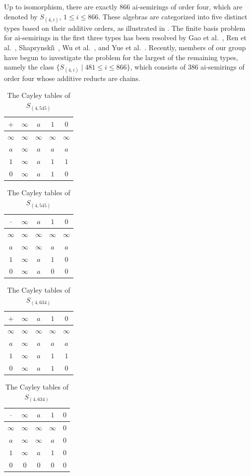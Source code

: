 \documentclass[reqno]{amsart}
\theoremstyle{plain}
\theoremstyle{definition}
\begin{document}
Up to isomorphism, there are exactly $866$ ai-semirings of order four,
which are denoted by $S_{(4, i)}$, $1\leq i\leq 866$.
These algebras are categorized into five distinct types based on their additive orders,
as illustrated in \cite[Figure 1]{rlzc}. The finite basis problem for ai-semirings in the first three types has
been resolved by Gao et al.~\cite{gmrz}, Ren et al.~\cite{rjzl, rlyc, rlzc}, Shaprynski\v{\i}~\cite{shap23},
Wu et al.~\cite{wrz}, and Yue et al.~\cite{yrzs}.
Recently, members of our group have begun to investigate the problem for the largest of the remaining types,
namely the class $\{S_{(4,i)} \mid 481\leq i\leq 866\}$,
which consists of $386$ ai-semirings of order four whose additive reducts are chains.


\begin{table}[ht]
\caption{The Cayley tables of $S_{(4, 545)}$} \label{tb545}
\begin{tabular}{c|cccc}
$+$      &$\infty$&$a$&$1$&$0$\\
\hline
$\infty$ &$\infty$&$\infty$&$\infty$&$\infty$\\
$a$      &$\infty$&$a$&$a$&$a$\\
$1$      &$\infty$&$a$&$1$&$1$\\
$0$      &$\infty$&$a$&$1$&$0$\\
\end{tabular}\qquad
\begin{tabular}{c|cccc}
$\cdot$  &$\infty$&$a$&$1$&$0$\\
\hline
$\infty$ &$\infty$&$\infty$&$\infty$&$\infty$\\
$a$      &$\infty$&$\infty$&$a$&$a$\\
$1$      &$\infty$&$a$&$1$&$0$\\
$0$       &$\infty$&$a$&$0$&$0$\\
\end{tabular}
\end{table}


\begin{table}[ht]
\caption{The Cayley tables of $S_{(4, 634)}$} \label{tb634}
\begin{tabular}{c|cccc}
$+$      &$\infty$&$a$&$1$&$0$\\
\hline
$\infty$ &$\infty$&$\infty$&$\infty$&$\infty$\\
$a$      &$\infty$&$a$&$a$&$a$\\
$1$      &$\infty$&$a$&$1$&$1$\\
$0$      &$\infty$&$a$&$1$&$0$\\
\end{tabular}\qquad
\begin{tabular}{c|cccc}
$\cdot$  &$\infty$&$a$&$1$&$0$\\
\hline
$\infty$ &$\infty$&$\infty$&$\infty$&$0$\\
$a$      &$\infty$&$\infty$&$a$&$0$\\
$1$      &$\infty$&$a$&$1$&$0$\\
$0$        &$0$&$0$&$0$&$0$\\
\end{tabular}
\end{table}
\end{document}
